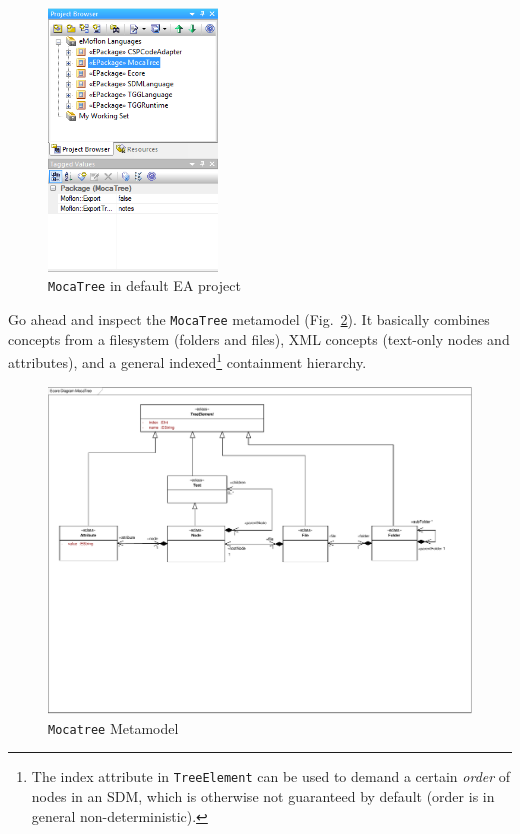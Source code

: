 \begin{enumerate}
\begin{figure}[!htbp]
\begin{center}
 \includegraphics[width=0.4\textwidth]{pics/moca/1DictionaryMetaModel/4-eapContainsMocatreeWithExportFalse}
  \caption{\texttt{MocaTree} in default EA project}
  \label{fig:moca-4-eapContainsMocatreeWithExportFalse}
\end{center}
\end{figure}
\end{enumerate}

Go ahead and inspect the \texttt{MocaTree} metamodel (Fig.~\ref{fig:moca-tree}).
It basically combines concepts from a filesystem (folders and files), XML concepts (text-only nodes and attributes), and a general indexed\footnote{The index attribute in \texttt{TreeElement} can be used to demand a certain \emph{order} of nodes in an SDM, which is otherwise not guaranteed by default (order is in general non-deterministic).} containment hierarchy.

\begin{figure}[!htbp]
\begin{center}
 \includegraphics[width=\textwidth]{pics/moca/0Install/0-MocaTree}
  \caption{\texttt{Mocatree} Metamodel}
  \label{fig:moca-tree}
\end{center}
\end{figure}
 
